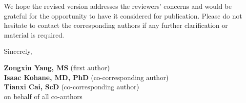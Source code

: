 \documentclass[11pt,letterpaper]{article}
\begin{document}
\medskip

We hope the revised version addresses the reviewers' concerns and would be grateful for the opportunity to have it considered for publication. Please do not hesitate to contact the corresponding authors if any further clarification or material is required.

\bigskip

Sincerely,

\bigskip\bigskip\bigskip

\noindent
\textbf{Zongxin Yang, MS} (first author)\\
\textbf{Isaac Kohane, MD, PhD} (co-corresponding author)\\
\textbf{Tianxi Cai, ScD} (co-corresponding author)\\
on behalf of all co-authors
\end{document}
